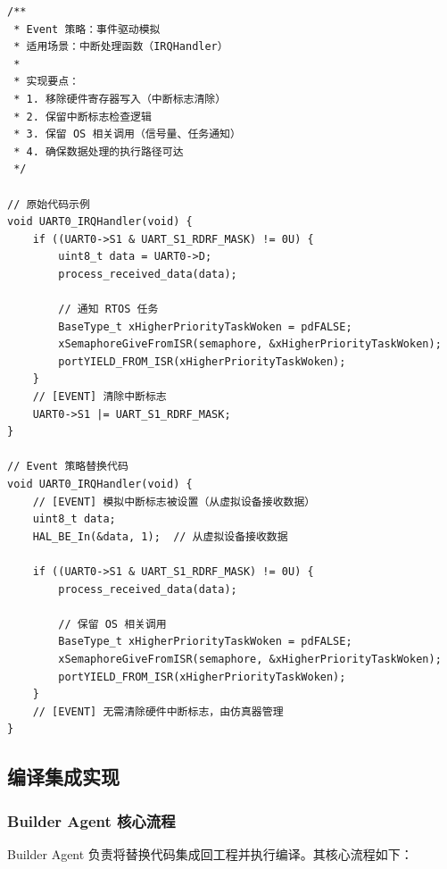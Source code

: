 \begin{lstlisting}[style=CStyle,abovecaptionskip=0pt,belowcaptionskip=0pt]
/**
 * Event 策略：事件驱动模拟
 * 适用场景：中断处理函数（IRQHandler）
 *
 * 实现要点：
 * 1. 移除硬件寄存器写入（中断标志清除）
 * 2. 保留中断标志检查逻辑
 * 3. 保留 OS 相关调用（信号量、任务通知）
 * 4. 确保数据处理的执行路径可达
 */

// 原始代码示例
void UART0_IRQHandler(void) {
    if ((UART0->S1 & UART_S1_RDRF_MASK) != 0U) {
        uint8_t data = UART0->D;
        process_received_data(data);
        
        // 通知 RTOS 任务
        BaseType_t xHigherPriorityTaskWoken = pdFALSE;
        xSemaphoreGiveFromISR(semaphore, &xHigherPriorityTaskWoken);
        portYIELD_FROM_ISR(xHigherPriorityTaskWoken);
    }
    // [EVENT] 清除中断标志
    UART0->S1 |= UART_S1_RDRF_MASK;
}

// Event 策略替换代码
void UART0_IRQHandler(void) {
    // [EVENT] 模拟中断标志被设置（从虚拟设备接收数据）
    uint8_t data;
    HAL_BE_In(&data, 1);  // 从虚拟设备接收数据
    
    if ((UART0->S1 & UART_S1_RDRF_MASK) != 0U) {
        process_received_data(data);
        
        // 保留 OS 相关调用
        BaseType_t xHigherPriorityTaskWoken = pdFALSE;
        xSemaphoreGiveFromISR(semaphore, &xHigherPriorityTaskWoken);
        portYIELD_FROM_ISR(xHigherPriorityTaskWoken);
    }
    // [EVENT] 无需清除硬件中断标志，由仿真器管理
}
\end{lstlisting}

\subsection{编译集成实现}

\subsubsection{Builder Agent 核心流程}

Builder Agent 负责将替换代码集成回工程并执行编译。其核心流程如下：

